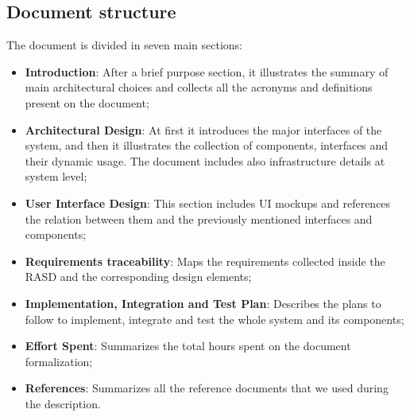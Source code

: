 \subsection{Document structure}
The document is divided in seven main sections:
\begin{itemize}
    \item \textbf{Introduction}: After a brief purpose section, it illustrates the summary of main architectural choices and collects all the acronyms and definitions present on the document;
    \item \textbf{Architectural Design}: At first it introduces the major interfaces of the system, and then it illustrates the collection of components, interfaces and their dynamic usage. The document includes also infrastructure details at system level;
    \item \textbf{User Interface Design}: This section includes \ac{UI} mockups and references the relation between them and the previously mentioned interfaces and components;
    \item \textbf{Requirements traceability}: Maps the requirements collected inside the \ac{RASD} and the corresponding design elements;
    \item \textbf{Implementation, Integration and Test Plan}: Describes the plans to follow to implement, integrate and test the whole system and its components;
    \item \textbf{Effort Spent}: Summarizes the total hours spent on the document formalization;
    \item \textbf{References}: Summarizes all the reference documents that we used during the description.
\end{itemize}

\clearpage